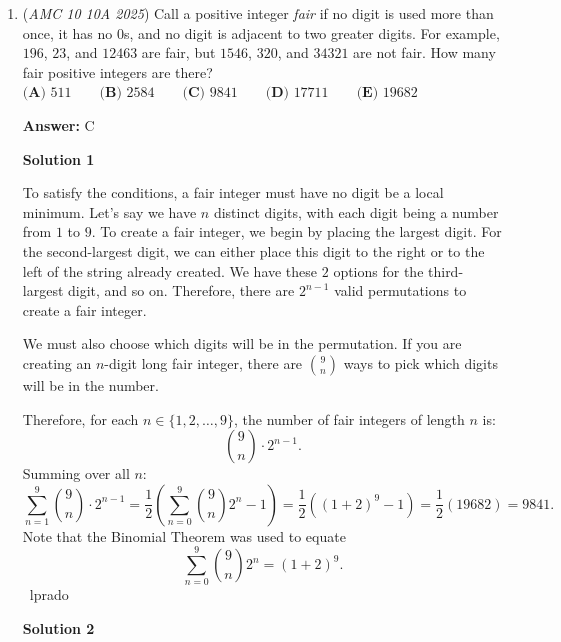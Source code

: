 \begin{enumerate}
 $\cos(2\theta) = 2\cos^2(\theta) - 1 = \frac{7}{18} \implies \cos^2(\theta) = \frac{25}{36} \implies \cos(\theta) = \frac{5}{6}$. 

 Finally, by $SOH-CAH-TOA$ note that $\cos(\theta) = \frac{BD}{BP} = \frac{5}{6}$ and we know $BD = \frac{35}{2}$ so 

 $BP = \frac{6}{5} \cdot \frac{35}{2} = \boxed{21}$.

 


 


	\item (\textit{AMC 10 10A 2025}) Call a positive integer \textit{fair} if no digit is used more than once, it has no 0s, and no digit is adjacent to two greater digits. For example, $196$, $23$, and $12463$ are fair, but $1546$, $320$, and $34321$ are not fair. How many fair positive integers are there?
$\textbf{(A) } 511 \qquad\textbf{(B) } 2584 \qquad\textbf{(C) } 9841 \qquad\textbf{(D) } 17711 \qquad\textbf{(E) } 19682$

 \textbf{Answer: }C



\textbf{Solution 1}

To satisfy the conditions, a fair integer must have no digit be a local minimum. Let's say we have $n$ distinct digits, with each digit being a number from $1$ to $9$. To create a fair integer, we begin by placing the largest digit. For the second-largest digit, we can either place this digit to the right or to the left of the string already created. We have these $2$ options for the third-largest digit, and so on. Therefore, there are $2^{n-1}$ valid permutations to create a fair integer.

 We must also choose which digits will be in the permutation. If you are creating an $n$-digit long fair integer, there are $\binom{9}{n}$ ways to pick which digits will be in the number.

 Therefore, for each $n \in \{1,2,\dots, 9\}$, the number of fair integers of length $n$ is:
 \[\binom{9}{n} \cdot 2^{n-1}.\]Summing over all $n$:
 \[\sum_{n=1}^9{\binom{9}{n} \cdot 2^{n-1}}=\frac{1}{2}\left(\sum_{n=0}^9{\binom{9}{n}}2^n -1\right)=\frac{1}{2}\left((1+2)^9 -1 \right) = \frac{1}{2}(19682) = \boxed{9841}.\]Note that the Binomial Theorem was used to equate
 \[\sum_{n=0}^9{\binom{9}{n}}2^n = (1+2)^9.\]~lprado

 



\textbf{Solution 2}


\end{enumerate}
